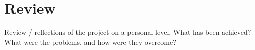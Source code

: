 \section{Review}\label{review}
Review / reflections of the project on a personal level. What has been achieved? What were the problems, and how were they overcome?


